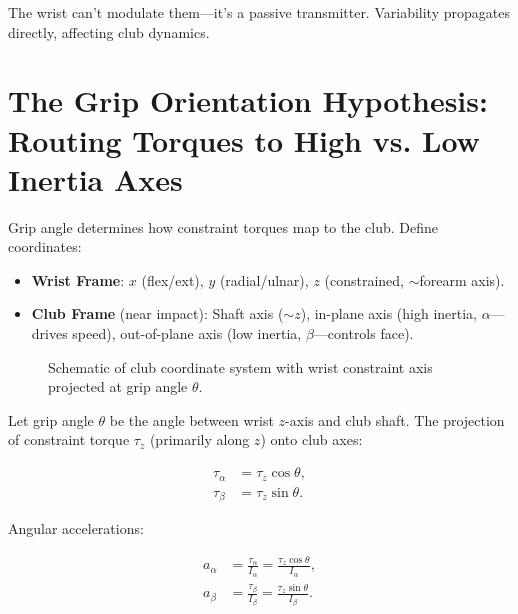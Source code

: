 \documentclass[11pt]{article}
\begin{document}
The wrist can't modulate them—it's a passive transmitter. Variability propagates directly, affecting club dynamics.

\section{The Grip Orientation Hypothesis: Routing Torques to High vs. Low Inertia Axes}

Grip angle determines how constraint torques map to the club. Define coordinates:

\begin{itemize}
    \item \textbf{Wrist Frame}: $x$ (flex/ext), $y$ (radial/ulnar), $z$ (constrained, $\sim$forearm axis).
    \item \textbf{Club Frame} (near impact): Shaft axis ($\sim z$), in-plane axis (high inertia, $\alpha$—drives speed), out-of-plane axis (low inertia, $\beta$—controls face).
\end{itemize}

\begin{figure}[h]
\centering
{}
\caption{Schematic of club coordinate system with wrist constraint axis projected at grip angle $\theta$.}
\label{fig:coord_sys}
\end{figure}

Let grip angle $\theta$ be the angle between wrist $z$-axis and club shaft. The projection of constraint torque $\tau_z$ (primarily along $z$) onto club axes:

\begin{align}
    \tau_\alpha &= \tau_z \cos \theta, \\
    \tau_\beta &= \tau_z \sin \theta.
\end{align}

Angular accelerations:

\begin{align}
    a_\alpha &= \frac{\tau_\alpha}{I_\alpha} = \frac{\tau_z \cos \theta}{I_\alpha}, \\
    a_\beta &= \frac{\tau_\beta}{I_\beta} = \frac{\tau_z \sin \theta}{I_\beta}.
\end{align}
\end{document}
